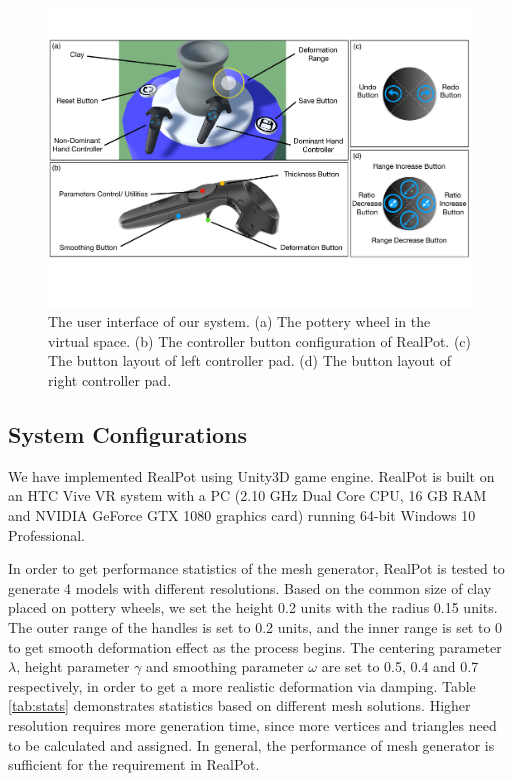 \documentclass{svjour3}                     %
\begin{document}
\begin{figure}
\includegraphics[width=\textwidth]{fig9}
\caption{The user interface of our system. (a) The pottery wheel in the virtual space. (b) The controller button configuration of RealPot. (c) The button layout of left controller pad. (d) The button layout of right controller pad.}
\label{fig:ui}
\end{figure}


\subsection{System Configurations}
\label{sec:config}

We have implemented RealPot using Unity3D \cite{website:unity} game engine. RealPot is built on an HTC Vive VR system with a PC (2.10 GHz Dual Core CPU, 16 GB RAM and NVIDIA GeForce GTX 1080 graphics card) running 64-bit Windows 10 Professional.

In order to get performance statistics of the mesh generator, RealPot is tested to generate 4 models with different resolutions.
Based on the common size of clay placed on pottery wheels, we set the height 0.2 units with the radius 0.15 units.
The outer range of the handles is set to 0.2 units, and the inner range is set to 0 to get smooth deformation effect as the process begins. The centering parameter $\lambda$, height parameter $\gamma$ and smoothing parameter $\omega$ are set to 0.5, 0.4 and 0.7 respectively, in order to get a more realistic deformation via damping.
Table \ref{tab:stats} demonstrates statistics based on different mesh solutions. Higher resolution requires more generation time, since more vertices and triangles need to be calculated and assigned. In general, the performance of mesh generator is sufficient for the requirement in RealPot.
\end{document}
